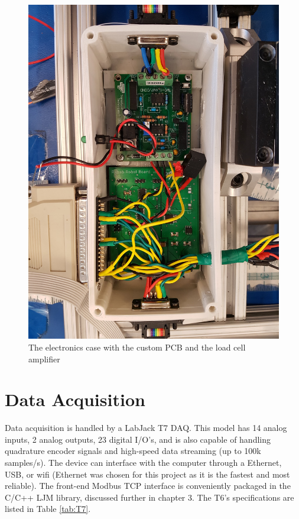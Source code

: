 \documentclass[12pt]{report}
\begin{document}
	
		\begin{figure}[h] 
		\centering
		\includegraphics[width=0.75\linewidth]{pcb_case}
		\caption{The electronics case with the custom PCB and the load cell amplifier}
		\label{fig:proto}
	\end{figure}
	

	
	\section{Data Acquisition} 

	Data acquisition is handled by a LabJack T7 DAQ. This model has 14 analog inputs, 2 analog outputs, 23 digital I/O's, and is also capable of handling quadrature encoder signals and high-speed data streaming (up to 100k samples/s). The device can interface with the computer through a Ethernet, USB, or wifi (Ethernet was chosen for this project as it is the fastest and most reliable). The front-end Modbus TCP interface is conveniently packaged in the C/C++ LJM library, discussed further in chapter 3. The T6's specifications are listed in Table \ref{tab:T7}.
	
\end{document}
